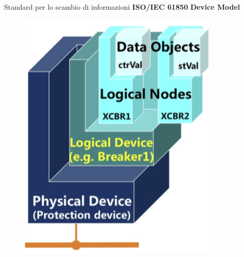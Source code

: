 
\begin{frame}{Standard per lo scambio di informazioni}
\textbf{ISO/IEC 61850}
	\newline\textbf{Device Model}
	\begin{figure}[h] 
		\includegraphics[scale=0.35,cfbox=blue_slides 1pt 0pt]{imgs/iec61850ln.png}
	\end{figure}
\end{frame}

